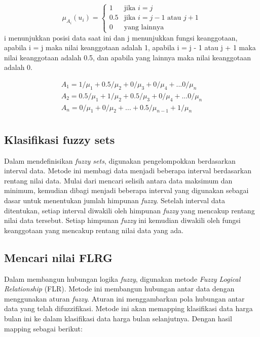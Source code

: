 \documentclass[conference]{IEEEtran}
\begin{document}
\[
\mu_{A_i}(u_i) = 
\begin{cases} 
1 & \text{jika } i = j \\
0.5 & \text{jika } i = j - 1 \text{ atau } j + 1 \\
0 & \text{yang lainnya}
\end{cases}
\]
i menunjukkan posisi data saat ini dan j menunjukkan fungsi keanggotaan, apabila i = j maka nilai keanggotaan adalah 1, apabila i = j - 1 atau j + 1 maka nilai keanggotaan adalah 0.5, dan apabila yang lainnya maka nilai keanggotaan adalah 0.

\begin{equation}
\label{eq:1}
\begin{aligned}
    {A_1} = 1/{\mu_1} + 0.5/{\mu_2} + 0/{\mu_3} + 0/{\mu_4} + ... 0/{\mu_n} \\
    {A_2} = 0.5/{\mu_1} + 1/{\mu_2} + 0.5/{\mu_3} + 0/{\mu_4} + ... 0/{\mu_n} \\
    {A_n} = 0/{\mu_1} + 0/{\mu_2} + ... + 0.5/{\mu_{n-1}} + 1/{\mu_n} \\
\end{aligned}
\end{equation}

   



\subsection{Klasifikasi fuzzy sets}
Dalam mendefinisikan \textit{fuzzy sets}, digunakan pengelompokkan berdasarkan interval data. Metode ini membagi data menjadi beberapa interval berdasarkan rentang nilai data. Mulai dari mencari selisih antara data maksimum dan minimum, kemudian dibagi menjadi beberapa interval yang digunakan sebagai dasar untuk menentukan jumlah himpunan \textit{fuzzy}. Setelah interval data ditentukan, setiap interval diwakili oleh himpunan \textit{fuzzy} yang mencakup rentang nilai data tersebut. Setiap himpunan \textit{fuzzy} ini kemudian diwakili oleh fungsi keanggotaan yang mencakup rentang nilai data yang ada.

\subsection{Mencari nilai FLRG}
Dalam membangun hubungan logika \textit{fuzzy}, digunakan metode \textit{Fuzzy Logical Relationship} (FLR). Metode ini membangun hubungan antar data dengan menggunakan aturan \textit{fuzzy}. Aturan ini menggambarkan pola hubungan antar data yang telah difuzzifikasi. Metode ini akan memapping klasifikasi data harga bulan ini ke dalam klasifikasi data harga bulan selanjutnya. Dengan hasil mapping sebagai berikut:
\end{document}
